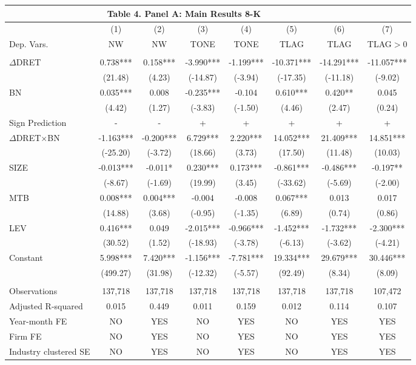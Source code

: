 \begin{table}[htbp] \label{T4PA}
  \centering
    \begin{tabular}{lccccccc}
    \multicolumn{7}{c}{\textbf{Table 4. Panel A: Main Results 8-K}} \\
    \midrule
      & (1) & (2) & (3) & (4) & (5) & (6) & (7)\\
    Dep. Vars. & NW & NW & TONE & TONE & TLAG & TLAG & TLAG$>$0\\
    \midrule
      &   &   &   &   &   &  &  \\
    $\Delta$DRET & 0.738*** & 0.158*** & -3.990*** & -1.199*** & -10.371*** & -14.291*** & -11.057*** \\
      & (21.48) & (4.23) & (-14.87) & (-3.94) & (-17.35) & (-11.18) & (-9.02) \\
    BN & 0.035*** & 0.008 & -0.235*** & -0.104 & 0.610*** & 0.420** & 0.045 \\
      & (4.42) & (1.27) & (-3.83) & (-1.50) & (4.46) & (2.47) & (0.24) \\
    \rowcolor[rgb]{ .933,  .925,  .882} Sign Prediction & - & - & + & + & + & + & + \\
    \rowcolor[rgb]{ .933,  .925,  .882} $\Delta$DRET$\times$BN & -1.163*** & -0.200*** & 6.729*** & 2.220*** & 14.052*** & 21.409*** & 14.851*** \\
    \rowcolor[rgb]{ .933,  .925,  .882}   & (-25.20) & (-3.72) & (18.66) & (3.73) & (17.50) & (11.48) & (10.03) \\
    SIZE & -0.013*** & -0.011* & 0.230*** & 0.173*** & -0.861*** & -0.486*** & -0.197** \\
      & (-8.67) & (-1.69) & (19.99) & (3.45) & (-33.62) & (-5.69) & (-2.00) \\
    MTB & 0.008*** & 0.004*** & -0.004 & -0.008 & 0.067*** & 0.013 & 0.017 \\
      & (14.88) & (3.68) & (-0.95) & (-1.35) & (6.89) & (0.74) & (0.86) \\
    LEV & 0.416*** & 0.049 & -2.015*** & -0.966*** & -1.452*** & -1.732*** & -2.300*** \\
      & (30.52) & (1.52) & (-18.93) & (-3.78) & (-6.13) & (-3.62) & (-4.21) \\
    Constant & 5.998*** & 7.420*** & -1.156*** & -7.781*** & 19.334*** & 29.679*** & 30.446*** \\
      & (499.27) & (31.98) & (-12.32) & (-5.57) & (92.49) & (8.34) & (8.09) \\
      &   &   &   &   &   &  &  \\
    Observations & 137,718 & 137,718 & 137,718 & 137,718 & 137,718 & 137,718 & 107,472 \\
    Adjusted R-squared & 0.015 & 0.449 & 0.011 & 0.159 & 0.012 & 0.114 & 0.107 \\
    Year-month FE & NO & YES & NO & YES & NO & YES & YES \\
    Firm FE & NO & YES & NO & YES & NO & YES & YES \\
    Industry clustered SE & NO & YES & NO & YES & NO & YES & YES \\
    \bottomrule
    \end{tabular}%
\end{table}%
